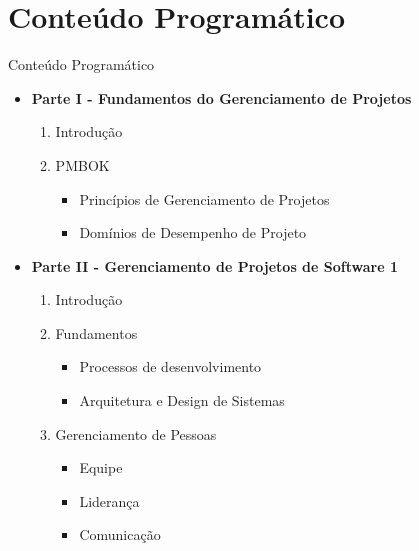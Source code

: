 \documentclass{beamer}
\begin{document}
\section{Conteúdo Programático}

\begin{frame}{Conteúdo Programático}
    \begin{itemize}
        \justifying
        \item \textbf{Parte I - Fundamentos do Gerenciamento de Projetos}
            \begin{enumerate}
                \justifying
                \item Introdução
                \item PMBOK
                    \begin{itemize}
                        \justifying
                        \item Princípios de Gerenciamento de Projetos
                        \item Domínios de Desempenho de Projeto
                    \end{itemize}
            \end{enumerate}
        \item \textbf{Parte II - Gerenciamento de Projetos de Software 1}
        	\begin{enumerate}
        		\justifying
        		\item Introdução
        		\item Fundamentos
        			\begin{itemize}
        				\justifying
        				\item Processos de desenvolvimento
        				\item Arquitetura e Design de Sistemas
        			\end{itemize}
        		\item Gerenciamento de Pessoas
        			\begin{itemize}
        				\justifying
        				\item Equipe
        				\item Liderança
        				\item Comunicação
        			\end{itemize}
        	\end{enumerate}
    \end{itemize}
\end{frame}
\end{document}
